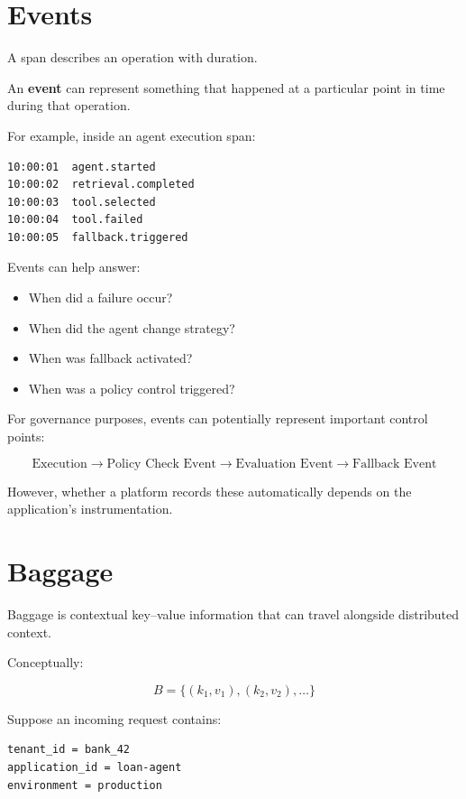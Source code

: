 \documentclass[11pt,a4paper]{article}
\begin{document}
\section{Events}

A span describes an operation with duration.

An \textbf{event} can represent something that happened at a particular point in time during that operation.

For example, inside an agent execution span:

\begin{lstlisting}
10:00:01  agent.started
10:00:02  retrieval.completed
10:00:03  tool.selected
10:00:04  tool.failed
10:00:05  fallback.triggered
\end{lstlisting}

Events can help answer:

\begin{itemize}
\item When did a failure occur?
\item When did the agent change strategy?
\item When was fallback activated?
\item When was a policy control triggered?
\end{itemize}

For governance purposes, events can potentially represent important control points:

\[
\text{Execution}
\rightarrow
\text{Policy Check Event}
\rightarrow
\text{Evaluation Event}
\rightarrow
\text{Fallback Event}
\]

However, whether a platform records these automatically depends on the application's instrumentation.

\section{Baggage}

Baggage is contextual key--value information that can travel alongside distributed context.

Conceptually:

\[
B = \{ (k_1,v_1), (k_2,v_2), \ldots \}
\]

Suppose an incoming request contains:

\begin{lstlisting}
tenant_id = bank_42
application_id = loan-agent
environment = production
\end{lstlisting}
\end{document}
